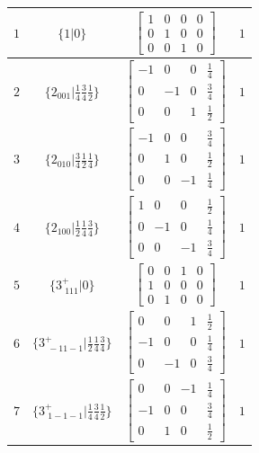 \documentclass[fleqn,8pt]{jsarticle}
\begin{document}
\begin{longtable}{cccc}
$ 1 $ & $ \{1|0\} $ & $ \begin{bmatrix} 1 & 0 & 0 & 0 \\ 0 & 1 & 0 & 0 \\ 0 & 0 & 1 & 0 \end{bmatrix} $ & $ 1 $ \\ \hline
$ 2 $ & $ \{2{}_{001}|\frac{1}{4} \frac{3}{4} \frac{1}{2}\} $ & $ \begin{bmatrix} -1 & 0 & 0 & \frac{1}{4} \\ 0 & -1 & 0 & \frac{3}{4} \\ 0 & 0 & 1 & \frac{1}{2} \end{bmatrix} $ & $ 1 $ \\ \hline
$ 3 $ & $ \{2{}_{010}|\frac{3}{4} \frac{1}{2} \frac{1}{4}\} $ & $ \begin{bmatrix} -1 & 0 & 0 & \frac{3}{4} \\ 0 & 1 & 0 & \frac{1}{2} \\ 0 & 0 & -1 & \frac{1}{4} \end{bmatrix} $ & $ 1 $ \\ \hline
$ 4 $ & $ \{2{}_{100}|\frac{1}{2} \frac{1}{4} \frac{3}{4}\} $ & $ \begin{bmatrix} 1 & 0 & 0 & \frac{1}{2} \\ 0 & -1 & 0 & \frac{1}{4} \\ 0 & 0 & -1 & \frac{3}{4} \end{bmatrix} $ & $ 1 $ \\ \hline
$ 5 $ & $ \{3^{+}_{\,\,111}|0\} $ & $ \begin{bmatrix} 0 & 0 & 1 & 0 \\ 1 & 0 & 0 & 0 \\ 0 & 1 & 0 & 0 \end{bmatrix} $ & $ 1 $ \\ \hline
$ 6 $ & $ \{3^{+}_{\,\,-11-1}|\frac{1}{2} \frac{1}{4} \frac{3}{4}\} $ & $ \begin{bmatrix} 0 & 0 & 1 & \frac{1}{2} \\ -1 & 0 & 0 & \frac{1}{4} \\ 0 & -1 & 0 & \frac{3}{4} \end{bmatrix} $ & $ 1 $ \\ \hline
$ 7 $ & $ \{3^{+}_{\,\,1-1-1}|\frac{1}{4} \frac{3}{4} \frac{1}{2}\} $ & $ \begin{bmatrix} 0 & 0 & -1 & \frac{1}{4} \\ -1 & 0 & 0 & \frac{3}{4} \\ 0 & 1 & 0 & \frac{1}{2} \end{bmatrix} $ & $ 1 $ \\ \hline

\end{longtable}
\end{document}
